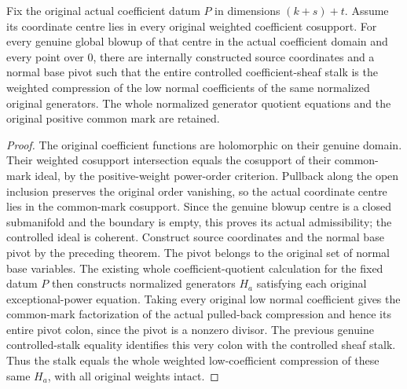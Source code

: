 \begin{theorem}
\label{hir:actual-centre-prescribed-coefficient-stalk}
\leanok
Fix the original actual coefficient datum $P$ in dimensions $(k+s)+t$. Assume its coordinate centre lies in every original weighted coefficient cosupport. For every genuine global blowup of that centre in the actual coefficient domain and every point over $0$, there are internally constructed source coordinates and a normal base pivot such that the entire controlled coefficient-sheaf stalk is the weighted compression of the low normal coefficients of the same normalized original generators. The whole normalized generator quotient equations and the original positive common mark are retained.
\end{theorem}
\begin{proof}
The original coefficient functions are holomorphic on their genuine domain. Their weighted cosupport intersection equals the cosupport of their common-mark ideal, by the positive-weight power-order criterion. Pullback along the open inclusion preserves the original order vanishing, so the actual coordinate centre lies in the common-mark cosupport. Since the genuine blowup centre is a closed submanifold and the boundary is empty, this proves its actual admissibility; the controlled ideal is coherent. Construct source coordinates and the normal base pivot by the preceding theorem. The pivot belongs to the original set of normal base variables. The existing whole coefficient-quotient calculation for the fixed datum $P$ then constructs normalized generators $H_a$ satisfying each original exceptional-power equation. Taking every original low normal coefficient gives the common-mark factorization of the actual pulled-back compression and hence its entire pivot colon, since the pivot is a nonzero divisor. The previous genuine controlled-stalk equality identifies this very colon with the controlled sheaf stalk. Thus the stalk equals the whole weighted low-coefficient compression of these same $H_a$, with all original weights intact.
\end{proof}
